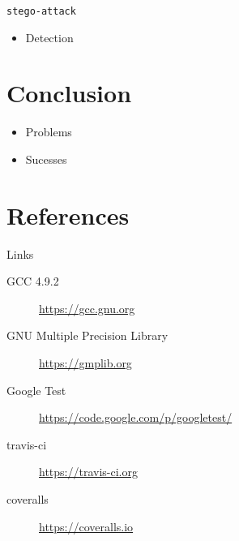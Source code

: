 \documentclass[presentation]{beamer}
\begin{document}
\begin{frame}[fragile,label=sec-3-6]{\texttt{stego-attack}}
 \begin{itemize}
\item Detection
\end{itemize}
\end{frame}
\section{Conclusion}
\label{sec:orgheadline1}
\begin{itemize}
\item Problems
\item Sucesses
\end{itemize}
\section{References}
\label{sec:orgheadline1}
\begin{frame}[label=sec-5-1]{Links}
\begin{description}
\item[{GCC 4.9.2}] \url{https://gcc.gnu.org}
\item[{GNU Multiple Precision Library}] \url{https://gmplib.org}
\item[{Google Test}] \url{https://code.google.com/p/googletest/}
\item[{travis-ci}] \url{https://travis-ci.org}
\item[{coveralls}] \url{https://coveralls.io}
\end{description}
\end{frame}
\end{document}
